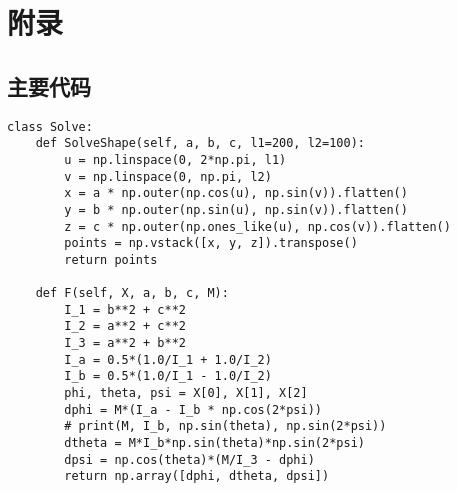\chapter*{附录}

\section*{主要代码}
\begin{spacing}{1.0}
\begin{lstlisting}
class Solve:
    def SolveShape(self, a, b, c, l1=200, l2=100):
        u = np.linspace(0, 2*np.pi, l1)
        v = np.linspace(0, np.pi, l2)
        x = a * np.outer(np.cos(u), np.sin(v)).flatten()
        y = b * np.outer(np.sin(u), np.sin(v)).flatten()
        z = c * np.outer(np.ones_like(u), np.cos(v)).flatten()
        points = np.vstack([x, y, z]).transpose()
        return points

    def F(self, X, a, b, c, M):
        I_1 = b**2 + c**2
        I_2 = a**2 + c**2
        I_3 = a**2 + b**2
        I_a = 0.5*(1.0/I_1 + 1.0/I_2)
        I_b = 0.5*(1.0/I_1 - 1.0/I_2)
        phi, theta, psi = X[0], X[1], X[2]
        dphi = M*(I_a - I_b * np.cos(2*psi))
        # print(M, I_b, np.sin(theta), np.sin(2*psi))
        dtheta = M*I_b*np.sin(theta)*np.sin(2*psi)
        dpsi = np.cos(theta)*(M/I_3 - dphi)
        return np.array([dphi, dtheta, dpsi])
\end{lstlisting}
\end{spacing}